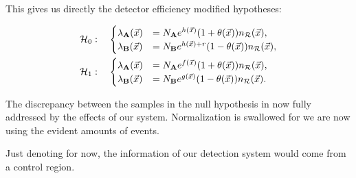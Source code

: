 \documentclass[../../ddppaper2.tex]{subfiles}
\begin{document}
This gives us directly the detector efficiency modified hypotheses:

\begin{equation}
\begin{aligned}
    {{\mathcal{H}_{0}}} &: \quad
    \begin{cases}
        {{\lambda}_{{\mathbf{A}}}(\vec{{x}})}
        &=
        N_{{\mathbf{A}}}
        e^{h(\vec{{x}})} (1 + {\theta}(\vec{{x}})) n_{\mathcal{R}}({\vec{{x}}}),
        \\
        {{\lambda}_{{\mathbf{B}}}(\vec{{x}})}
        &=
        N_{{\mathbf{B}}}
        e^{h(\vec{{x}})+r} (1 - {\theta}(\vec{{x}}))n_{\mathcal{R}}({\vec{{x}}}),
    \end{cases} \\
    {\mathcal{H}_{1}} &: \quad
    \begin{cases}
        {{\lambda}_{{\mathbf{A}}}(\vec{{x}})}
        &=
        N_{{\mathbf{A}}}
        e^{f(\vec{{x}})} (1 + {\theta}(\vec{{x}}))n_{\mathcal{R}}({\vec{{x}}}),
        \\
        {{\lambda}_{{\mathbf{B}}}(\vec{{x}})}
        &=
        N_{{\mathbf{B}}}
        e^{g(\vec{{x}})} (1 - {\theta}(\vec{{x}}))n_{\mathcal{R}}({\vec{{x}}}).
    \end{cases}
\end{aligned}
\end{equation}

The discrepancy between the samples in the null hypothesis in now fully addressed by the effects of our system. Normalization is swallowed for we are now using the evident amounts of events.

Just denoting for now, the information of our detection system would come from a control region.
\end{document}
